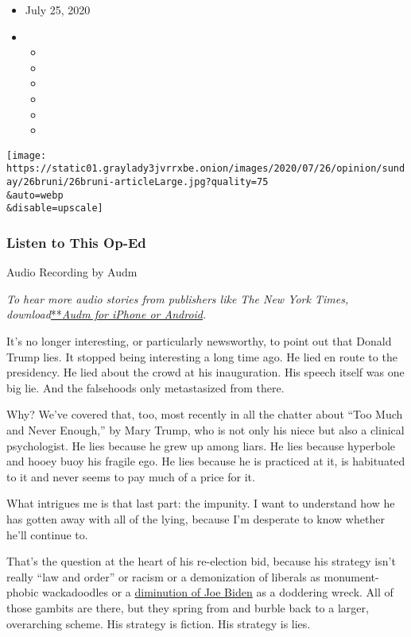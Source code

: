 \begin{itemize}
\item
  July 25, 2020
\item
  \begin{itemize}
  \item
  \item
  \item
  \item
  \item
  \item
  \end{itemize}
\end{itemize}

\texttt{[image: https://static01.graylady3jvrrxbe.onion/images/2020/07/26/opinion/sunday/26bruni/26bruni-articleLarge.jpg?quality=75\\\&auto=webp\\\&disable=upscale]}

\hypertarget{listen-to-this-op-ed}{%
\subsubsection{Listen to This Op-Ed}\label{listen-to-this-op-ed}}

Audio Recording by Audm

\emph{To hear more audio stories from publishers like The New York
Times,
download}\href{https://www.audm.com/?utm_source=nytmag\&utm_medium=embed\&utm_campaign=left_behind_draper}{**}\href{https://www.audm.com/?utm_source=nytopinion\&utm_medium=embed\&utm_campaign=trump_history_cosmos}{\emph{Audm
for iPhone or Android}}\emph{.}

It's no longer interesting, or particularly newsworthy, to point out
that Donald Trump lies. It stopped being interesting a long time ago. He
lied en route to the presidency. He lied about the crowd at his
inauguration. His speech itself was one big lie. And the falsehoods only
metastasized from there.

Why? We've covered that, too, most recently in all the chatter about
``Too Much and Never Enough,'' by Mary Trump, who is not only his niece
but also a clinical psychologist. He lies because he grew up among
liars. He lies because hyperbole and hooey buoy his fragile ego. He lies
because he is practiced at it, is habituated to it and never seems to
pay much of a price for it.

What intrigues me is that last part: the impunity. I want to understand
how he has gotten away with all of the lying, because I'm desperate to
know whether he'll continue to.

That's the question at the heart of his re-election bid, because his
strategy isn't really ``law and order'' or racism or a demonization of
liberals as monument-phobic wackadoodles or a
\href{https://www.nytimes3xbfgragh.onion/2020/05/17/opinion/trump-biden-age.html}{diminution
of Joe Biden} as a doddering wreck. All of those gambits are there, but
they spring from and burble back to a larger, overarching scheme. His
strategy is fiction. His strategy is lies.


